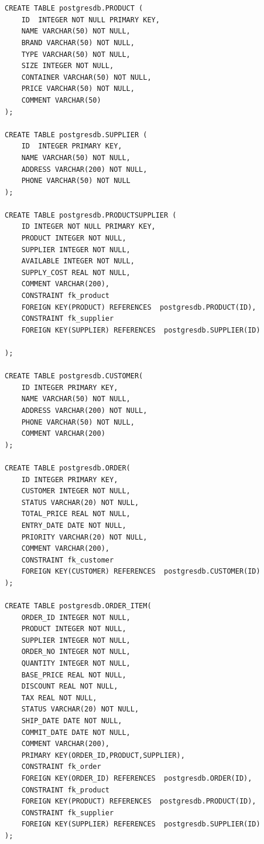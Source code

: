 \documentclass[12pt,oneside]{memoir}
\begin{document}
\begin{lstlisting}[title={setup-postgres-model.sql},captionpos=t]


CREATE TABLE postgresdb.PRODUCT (
    ID  INTEGER NOT NULL PRIMARY KEY,
    NAME VARCHAR(50) NOT NULL,
    BRAND VARCHAR(50) NOT NULL,
    TYPE VARCHAR(50) NOT NULL,
    SIZE INTEGER NOT NULL,
    CONTAINER VARCHAR(50) NOT NULL,
    PRICE VARCHAR(50) NOT NULL,
    COMMENT VARCHAR(50)
);

CREATE TABLE postgresdb.SUPPLIER (
    ID  INTEGER PRIMARY KEY,
    NAME VARCHAR(50) NOT NULL,
    ADDRESS VARCHAR(200) NOT NULL,
    PHONE VARCHAR(50) NOT NULL
);

CREATE TABLE postgresdb.PRODUCTSUPPLIER (
    ID INTEGER NOT NULL PRIMARY KEY,
    PRODUCT INTEGER NOT NULL,
    SUPPLIER INTEGER NOT NULL,
    AVAILABLE INTEGER NOT NULL,
    SUPPLY_COST REAL NOT NULL,
    COMMENT VARCHAR(200),
    CONSTRAINT fk_product
    FOREIGN KEY(PRODUCT) REFERENCES  postgresdb.PRODUCT(ID),
    CONSTRAINT fk_supplier
    FOREIGN KEY(SUPPLIER) REFERENCES  postgresdb.SUPPLIER(ID)
    
);

CREATE TABLE postgresdb.CUSTOMER(
    ID INTEGER PRIMARY KEY,
    NAME VARCHAR(50) NOT NULL,
    ADDRESS VARCHAR(200) NOT NULL,
    PHONE VARCHAR(50) NOT NULL,
    COMMENT VARCHAR(200)
);

CREATE TABLE postgresdb.ORDER(
    ID INTEGER PRIMARY KEY,
    CUSTOMER INTEGER NOT NULL,
    STATUS VARCHAR(20) NOT NULL,
    TOTAL_PRICE REAL NOT NULL,
    ENTRY_DATE DATE NOT NULL,
    PRIORITY VARCHAR(20) NOT NULL,
    COMMENT VARCHAR(200),
    CONSTRAINT fk_customer
    FOREIGN KEY(CUSTOMER) REFERENCES  postgresdb.CUSTOMER(ID)
);

CREATE TABLE postgresdb.ORDER_ITEM(
    ORDER_ID INTEGER NOT NULL,
    PRODUCT INTEGER NOT NULL,
    SUPPLIER INTEGER NOT NULL, 
    ORDER_NO INTEGER NOT NULL,
    QUANTITY INTEGER NOT NULL,
    BASE_PRICE REAL NOT NULL,
    DISCOUNT REAL NOT NULL,
    TAX REAL NOT NULL,
    STATUS VARCHAR(20) NOT NULL,
    SHIP_DATE DATE NOT NULL,
    COMMIT_DATE DATE NOT NULL,
    COMMENT VARCHAR(200),
    PRIMARY KEY(ORDER_ID,PRODUCT,SUPPLIER),
    CONSTRAINT fk_order
    FOREIGN KEY(ORDER_ID) REFERENCES  postgresdb.ORDER(ID),
    CONSTRAINT fk_product
    FOREIGN KEY(PRODUCT) REFERENCES  postgresdb.PRODUCT(ID),
    CONSTRAINT fk_supplier
    FOREIGN KEY(SUPPLIER) REFERENCES  postgresdb.SUPPLIER(ID)
);

\end{lstlisting}
\end{document}
